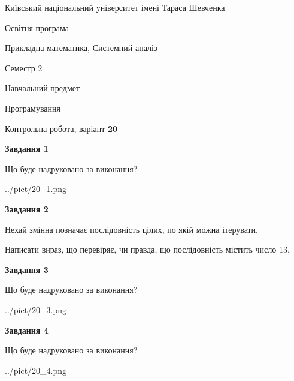 \documentclass[12pt, ukrainian]{article}
\begin{document}
{{\begin {small}\par
{ \center  Київський національний університет імені Тараса Шевченка \par}
{\parbox {5 cm}{Освітня програма \hfill}{\parbox {8 cm}{Прикладна математика, Системний аналіз \hfill}}\parbox {5 cm}{\hfill Семестр 2}}\par
{\parbox {5 cm} {Навчальний предмет \hfill}\parbox {7 cm}{Програмування \hfill}\parbox {6cm}{\hfill}\par}\vspace{-7pt} \end{small}}{\center Контрольна робота, варіант  \No \textbf
{ 20 }\par}}
{
\begin {large}
{\begin {center}\textbf{Завдання 1}\end {center}}\par
Що буде надруковано за виконання?\par\par
\begin{center}
	{../pict/20_1.png}
\end{center}
\newpage

{\begin {center}\textbf{Завдання 2}\end {center}}\par
Нехай змінна  позначає послідовність цілих, по якій можна ітерувати.

Написати вираз, що перевіряє, чи правда, що послідовність  містить число 13.\par
\newpage

{\begin {center}\textbf{Завдання 3}\end {center}}\par
Що буде надруковано за виконання?
\begin{center}
	{../pict/20_3.png}
\end{center}
\newpage

{\begin {center}\textbf{Завдання 4}\end {center}}\par
Що буде надруковано за виконання?\par
\begin{center}
	{../pict/20_4.png}
\end{center}
\newpage


\end{large}}
\end{document}
